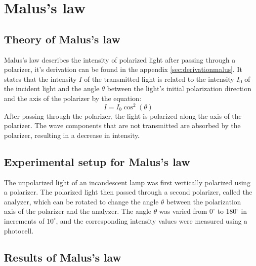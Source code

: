 \section{Malus's law}

    \subsection{Theory of Malus's law}
    Malus's law describes the intensity of polarized light after passing through a polarizer, it's derivation can be found in the appendix
    \ref{sec:derivationmalus}. It states that the intensity $I$ of the transmitted light is
    related to the intensity $I_0$ of the incident light and the angle $\theta$ between the light's initial polarization direction and the axis of the polarizer
    by the equation:
    \begin{equation}
        I = I_0 \cos^2(\theta)
        \label{eq:Malus}
    \end{equation} 
    After passing through the polarizer, the light is polarized along the axis of the polarizer. The wave components that are not transmitted are absorbed
    by the polarizer, resulting in a decrease in intensity.

    \subsection{Experimental setup for Malus's law}
    The unpolarized light of an incandescent lamp was first vertically polarized using a polarizer. The polarized light then passed through a second polarizer,
    called the analyzer, which can be rotated to change the angle $\theta$ between the polarization axis of the polarizer and the analyzer. The angle $\theta$
    was varied from $0^\circ$ to $180^\circ$ in increments of $10^\circ$, and the corresponding intensity values were measured using a photocell.
    
    \subsection{Results of Malus's law}

